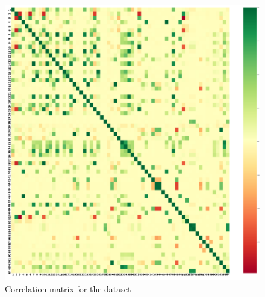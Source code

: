 \documentclass[11pt,a4paper]{article}
\begin{document}


\begin{figure}[htbp]
\includegraphics[width=2\columnwidth]{correlation_crop.png}
\caption{\label{fig::correlation} Correlation matrix for the dataset}
\end{figure}

\end{document}
